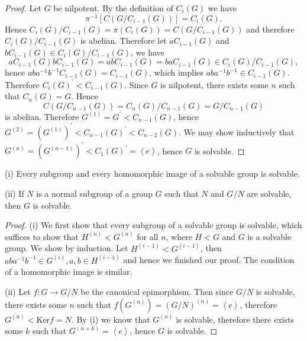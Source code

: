 \begin{proof}
Let $G$ be nilpotent. By the definition of $C_i(G)$ we have 
$$\pi ^{-1}\left[ C\left( G/C_{i-1}\left( G \right) \right) \right] =C_i\left( G \right) .$$
Hence $C_i\left( G \right) /C_{i-1}\left( G \right) =\pi \left( C_i\left( G \right) \right) =C\left( G/C_{i-1}\left( G \right) \right) $ and therefore $C_i(G)/C_{i-1}(G)$ is abelian. Therefore let $aC_{i-1}(G)$ and $bC_{i-1}(G)\in C_i(G)/C_{i-1}(G)$, we have 
$$
aC_{i-1}\left( G \right) bC_{i-1}\left( G \right) =abC_{i-1}\left( G \right) =baC_{i-1}\left( G \right) \in C_i\left( G \right) /C_{i-1}\left( G \right) ,
$$
hence $aba^{-1}b^{-1}C_{i-1}\left( G \right) =C_{i-1}\left( G \right) $, which implies $aba^{-1}b^{-1}\in C_{i-1}\left( G \right) $. Therefore $C_i\left( G \right) ^{\prime}<C_{i-1}\left( G \right) $. Since $G$ is nilpotent, there exists some $n$ such that $C_n(G)=G$. Hence 
$$C\left( G/C_{n-1}\left( G \right) \right) =C_n\left( G \right) /C_{n-1}\left( G \right) =G/C_{n-1}\left( G \right) $$
is abelian. Therefore $G^{\left( 1 \right)}=G^{\prime}<C_{n-1}\left( G \right) $, hence $G^{\left( 2 \right)}=\left( G^{\left( 1 \right)} \right) ^{\prime}<C_{n-1}\left( G \right) ^{\prime}<C_{n-2}\left( G \right) $. We may show inductively that $G^{\left( n \right)}=\left( G^{\left( n-1 \right)} \right) ^{\prime}<C_1\left( G \right) ^{\prime}=\left< e \right> $, hence $G$ is solvable.
\end{proof}
\begin{theorem}
(i) Every subgroup and every homomorphic image of a solvable group is solvable.\par
(ii) If $N$ is a normal subgroup of a group $G$ such that $N$ and $G/N$ are solvable, then $G$ is solvable.
\end{theorem}
\begin{proof}
(i) We first show that every subgroup of a solvable group is solvable, which suffices to show that $H^{(n)}<G^{(n)}$ for all $n$, where $H<G$ and $G$ is a solvable group. We show by induction. Let $H^{\left( i-1 \right)}<G^{\left( i-1 \right)}$, then $aba^{-1}b^{-1}\in G^{\left( i \right)},a,b\in H^{\left( i-1 \right)}$ and hence we finished our proof. The condition of a homomorphic image is similar.\par
(ii) Let $f:G\to G/N$ be the canonical epimorphism. Then since $G/N$ is solvable, there exists some $n$ such that $f\left( G^{\left( n \right)} \right) =\left( G/N \right) ^{\left( n \right)}=\left< e \right> $, therefore $G^{\left( n \right)}<\mathrm{Ker}f=N$. By (i) we know that $G^{(n)}$ is solvable, therefore there exists some $k$ such that $G^{(n+k)}=\left<e\right>$, hence $G$ is solvable.
\end{proof}
